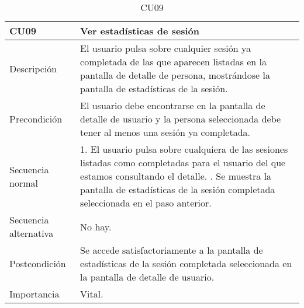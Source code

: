 \begin{table}[H]
\label{CU09}
\begin{center}
\begin{tabular}{| l | p{10cm} |}
\hline
CU09 & Ver estadísticas de sesión\\
\hline
Descripción & El usuario pulsa sobre cualquier sesión ya completada de las que aparecen listadas en la pantalla de detalle de persona, mostrándose la pantalla de estadísticas de la sesión.\\
\hline
Precondición & El usuario debe encontrarse en la pantalla de detalle de usuario y la persona seleccionada debe tener al menos una sesión ya completada.\\
\hline
Secuencia normal & 1. El usuario pulsa sobre cualquiera de las sesiones listadas como completadas para el usuario del que estamos consultando el detalle.
\newline 2. Se muestra la pantalla de estadísticas de la sesión completada seleccionada en el paso anterior.\\
\hline
Secuencia alternativa & No hay.\\
\hline
Postcondición & Se accede satisfactoriamente a la pantalla de estadísticas de la sesión completada seleccionada en la pantalla de detalle de usuario.\\
\hline
Importancia & Vital.\\
\hline
\end{tabular}
\end{center}
\caption{CU09}
\end{table}

